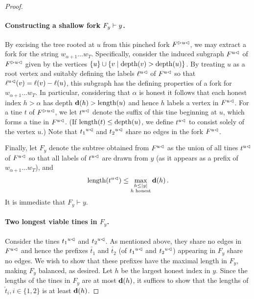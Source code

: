 \begin{proof}
    \paragraph{Constructing a shallow fork $F_y \Fork y$.}
    By excising the tree rooted at $u$ from this pinched fork
    $\pinch{u}{F}$, we may extract a fork for the string
    $w_{\alpha+1} \dots w_T$. Specifically, consider the induced
    subgraph $\cut{u}{F}$ of $\pinch{u}{F}$ given by the vertices
    $\{u\} \cup \{ v \mid \depth(v) > \depth(u)\}$. By treating $u$ as a
    root vertex and suitably defining the labels $\cut{u}{\ell}$ of
    $\cut{u}{F}$ so that $\cut{u}{\ell}(v) = \ell(v) - \ell(u)$, this
    subgraph has the defining properties of a fork for
    $w_{\alpha+1} \ldots w_T$. In particular, considering that
    $\alpha$ is honest it follows that each honest index $h > \alpha$
    has depth $\hdepth(h) > \length(u)$ and hence $h$ labels a vertex in
    $\cut{u}{F}$.  For a tine $t$ of $\pinch{u}{F}$, we let $\cut{u}{t}$
    denote the suffix of this tine beginning at $u$, which forms a tine
    in $\cut{u}{F}$. (If $\length(t) \leq \depth(u)$, we define
    $\cut{u}{t}$ to consist solely of the vertex $u$.)  Note that
    $\cut{u}{t_1}$ and $\cut{u}{t_2}$ share no edges in the fork
    $\cut{u}{F}$.
    
    Finally, let $F_y$ denote the subtree obtained from $\cut{u}{F}$
    as the union of all tines $\cut{u}{t}$ of $\cut{u}{F}$ so that all
    labels of $\cut{u}{t}$ are drawn from $y$ (as it appears as a prefix
    of $w_{\alpha+1} \ldots w_T$), and
    \begin{equation}\label{eq:tines-Fy}
      \length(\cut{u}{t}) \leq \max_{\substack{h \leq |y|\\ \text{$h$ honest} } } \hdepth(h)
      \,.
    \end{equation}
    It is immediate that $F_y \vdash y$. 
    
    \paragraph{Two longest viable tines in $F_y$.}
    Consider the tines $\cut{u}{t_1}$ and $\cut{u}{t_2}$. As mentioned
    above, they share no edges in $\cut{u}{F}$ and hence the prefixes
    $\check{t_1}$ and $\check{t_2}$ (of $\cut{u}{t_1}$ and
    $\cut{u}{t_2}$) appearing in $F_y$ share no edges. 
    We wish to
    show that these prefixes have the maximal length in $F_y$, making $F_y$ balanced, as desired. 
    Let $h$ be the largest honest index in $y$. 
    Since the lengths of the tines in $F_y$ 
    are at most $\hdepth(h)$, 
    it suffices to show that the lengths of 
    $\check{t}_i, i \in \{1,2\}$ is at least $\hdepth(h)$. 


\end{proof}
